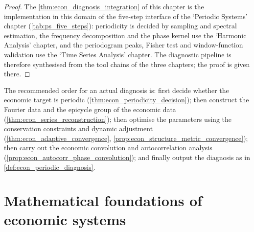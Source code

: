 \begin{proof}
The \cref{thm:econ_diagnosis_integration} of this chapter is the implementation in this domain of the five-step interface of the `Periodic Systems' chapter (\cref{tab:ps_five_steps}):
periodicity is decided by sampling and spectral estimation, the frequency decomposition and the phase kernel use the `Harmonic Analysis' chapter, and the periodogram peaks, Fisher test and
window-function validation use the `Time Series Analysis' chapter. The diagnostic pipeline is therefore synthesised from the tool chains of the three chapters; the proof is given there.
\end{proof}

\begin{remark}\label{rem:econ_integration_order}
The recommended order for an actual diagnosis is: first decide whether the economic target is periodic (\cref{thm:econ_periodicity_decision}); then construct the Fourier data and the epicycle group of the economic data (\cref{thm:econ_series_reconstruction}); then optimise the parameters using the conservation constraints and dynamic adjustment (\cref{thm:econ_adaptive_convergence}, \cref{prop:econ_structure_metric_convergence}); then carry out the economic convolution and autocorrelation analysis (\cref{prop:econ_autocorr_phase_convolution}); and finally output the diagnosis as in \cref{def:econ_periodic_diagnosis}.
\end{remark}

\section{Mathematical foundations of economic systems}

